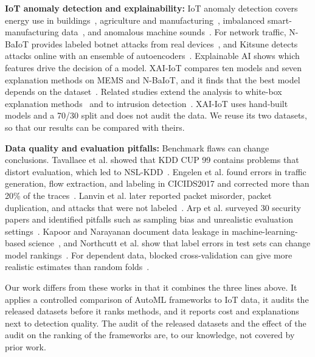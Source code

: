 \textbf{IoT anomaly detection and explainability:} IoT anomaly detection covers energy use in buildings~\cite{himeur2021}, agriculture and manufacturing~\cite{abdallah2021agri,abdallah2023sensors}, imbalanced smart-manufacturing data~\cite{fathy2021}, and anomalous machine sounds~\cite{koizumi2020}. For network traffic, N-BaIoT provides labeled botnet attacks from real devices~\cite{meidan2018nbaiot}, and Kitsune detects attacks online with an ensemble of autoencoders~\cite{mirsky2018kitsune}. Explainable AI shows which features drive the decision of a model. XAI-IoT compares ten models and seven explanation methods on MEMS and N-BaIoT, and it finds that the best model depends on the dataset~\cite{gummadi2024xaiiot}. Related studies extend the analysis to white-box explanation methods~\cite{gummadi2025whitebox} and to intrusion detection~\cite{arreche2024xaiids}. XAI-IoT uses hand-built models and a 70/30 split and does not audit the data. We reuse its two datasets, so that our results can be compared with theirs.

\textbf{Data quality and evaluation pitfalls:} Benchmark flaws can change conclusions. Tavallaee et al. showed that KDD CUP 99 contains problems that distort evaluation, which led to NSL-KDD~\cite{tavallaee2009}. Engelen et al. found errors in traffic generation, flow extraction, and labeling in CICIDS2017 and corrected more than 20\% of the traces~\cite{engelen2021}. Lanvin et al. later reported packet misorder, packet duplication, and attacks that were not labeled~\cite{lanvin2023}. Arp et al. surveyed 30 security papers and identified pitfalls such as sampling bias and unrealistic evaluation settings~\cite{arp2022}. Kapoor and Narayanan document data leakage in machine-learning-based science~\cite{kapoor2023}, and Northcutt et al. show that label errors in test sets can change model rankings~\cite{northcutt2021}. For dependent data, blocked cross-validation can give more realistic estimates than random folds~\cite{roberts2017}.

Our work differs from these works in that it combines the three lines above. It applies a controlled comparison of AutoML frameworks to IoT data, it audits the released datasets before it ranks methods, and it reports cost and explanations next to detection quality. The audit of the released datasets and the effect of the audit on the ranking of the frameworks are, to our knowledge, not covered by prior work.
